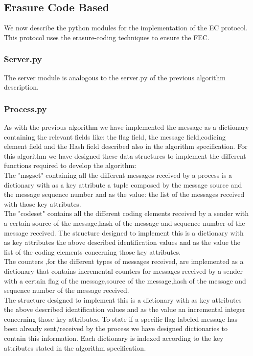 \documentclass[12pt]{article}
\begin{document}
\subsection{Erasure Code Based}
We now describe the python modules for the implementation of the EC protocol. This protocol uses the erasure-coding techniques to ensure the FEC. \\
\subsubsection{Server.py}
The server module is analogous to the server.py of the previous algorithm description. \\
\subsubsection{Process.py}
As with the previous algorithm we have implemented the message as a dictionary containing the relevant fields like: the flag field, the message field,codicing element field and the Hash field described also in the algorithm specification. For this algorithm we have designed these data structures to implement the different functions required to develop the algorithm:\\
The "msgset" containing all the different messages received by a process is a dictionary with as a key attribute a tuple composed by the message source and the message sequence number and as the value: the list of the messages received with those key attributes.\\
The "codeset" contains all the different coding elements received by a sender with a certain source of the message,hash of the message and sequence number of the message received. The structure designed to implement this is a dictionary with as key attributes the above described identification values and as the value the list of the coding elements concerning those key attributes.\\
The counters ,for the different types of messages received, are implemented as a dictionary that contains incremental counters for messages received by a sender with a certain flag of the message,source of the message,hash of the message and sequence number of the message received.\\ The structure designed to implement this is a dictionary with as key attributes the above described identification values and as the value an incremental integer concerning those key attributes.
To state if a specific flag-labeled message has been already sent/received by the process we have designed dictionaries to contain this information. Each dictionary is indexed according to the key attributes stated in the algorithm specification.\\
\end{document}
